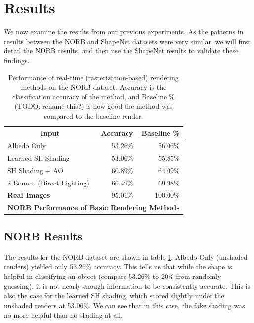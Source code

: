 \documentclass[10pt,twocolumn,letterpaper]{article}
\newcommand{\tompson}[1]{{\color{green} JT: #1}}
\begin{document}
\section{Results}
We now examine the results from our previous experiments. As the patterns in results between the NORB and ShapeNet datasets were very similar, we will first detail the NORB results, and then use the ShapeNet results to validate these findings.
\begin{table}[]
\centering
\begin{tabular}{|l|r|r|}
\hline
\multicolumn{1}{|c|}{\textbf{Input}}
& \multicolumn{1}{r|}{\textbf{Accuracy}}
& \multicolumn{1}{r|}{\textbf{Baseline \%}} \\ \hline
Albedo Only 				&53.26\%	& 56.06\%	\\
Learned SH Shading			&53.06\%	& 55.85\%	\\
SH Shading + AO				&60.89\%    & 64.09\%   \\
2 Bounce (Direct Lighting)	&66.49\%	& 69.98\%   \\
\textbf{Real Images}		& 95.01\%	& 100.00\%	\\ \hline
\multicolumn{3}{|c|}{\textbf{NORB Performance of Basic Rendering Methods}}	\\ \hline
\end{tabular}

\caption{Performance of real-time (rasterization-based) rendering methods on the NORB dataset. Accuracy is the classification accuracy of the method, and Baseline \% (TODO: rename this?) is how good the method was compared to the baseline render.}
\label{table:tblnonGI}
\end{table}
\subsection{NORB Results}
The results for the NORB dataset are shown in table \ref{table:tblnonGI}. Albedo Only (unshaded renders) yielded only 53.26\% accuracy. This tells us that while the shape is helpful in classifying an object (compare 53.26\% to 20\% from randomly guessing), it is not nearly enough information to be consistently accurate. This is also the case for the learned SH shading, which scored slightly under the unshaded renders at 53.06\%. We can see that in this case, the fake shading was no more helpful than no shading at all.
\end{document}
